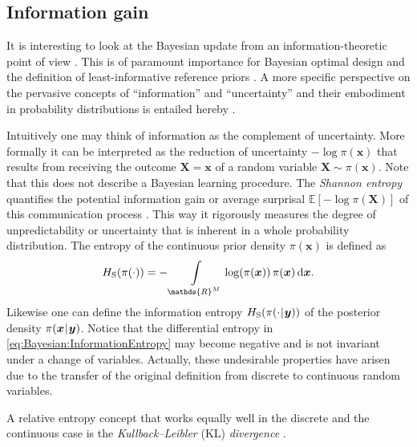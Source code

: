 \subsection{Information gain}
It is interesting to look at the Bayesian update from an information-theoretic point of view \cite{Bayesian:Lindley1956,Bayesian:Lindley1972}.
This is of paramount importance for Bayesian optimal design \cite{Bayesian:Bernardo1979:a,Bayesian:Chaloner1995}
and the definition of least-informative reference priors \cite{Bayesian:Bernardo1979:b,Bayesian:Berger2009}.
A more specific perspective on the pervasive concepts of ``information'' and ``uncertainty''
and their embodiment in probability distributions is entailed hereby \cite{Statistics:Cover2006,Statistics:Gray2011}.
\par %
Intuitively one may think of information as the complement of uncertainty.
More formally it can be interpreted as the reduction of uncertainty \(-\log \pi(\bm{x})\) that results
from receiving the outcome \(\bm{X} = \bm{x}\) of a random variable \(\bm{X} \sim \pi(\bm{x})\).
Note that this does not describe a Bayesian learning procedure.
The \emph{Shannon entropy} quantifies the potential information gain or average surprisal \(\mathds{E}[-\log \pi(\bm{X})]\)
of this communication process \cite{Statistics:Shannon1948:a,Statistics:Shannon1948:b}.
This way it rigorously measures the degree of unpredictability or uncertainty that is inherent in a whole probability distribution.
The entropy of the continuous prior density \(\pi(\bm{x})\) is defined as
\begin{equation} \label{eq:Bayesian:InformationEntropy}
  H_{\mathrm{S}}(\pi(\cdot)) = - \int\limits_{\mathds{R}^\dimParam} \log(\pi(\bm{x})) \, \pi(\bm{x}) \, \mathrm{d} \bm{x}.
\end{equation}
Likewise one can define the information entropy \(H_{\mathrm{S}}(\pi(\cdot {\:\!}|{\:\!} \bm{y}))\) of the posterior density \(\pi(\bm{x} {\:\!}|{\:\!} \bm{y})\).
Notice that the differential entropy in \cref{eq:Bayesian:InformationEntropy} may become negative and is not invariant under a change of variables.
Actually, these undesirable properties have arisen due to the transfer of the original definition from discrete to continuous random variables.
\par %
A relative entropy concept that works equally well in the discrete and the continuous case is the
\emph{Kullback--Leibler} (KL) \emph{divergence} \cite{Statistics:Kullback1951,Statistics:Kullback1968}.
